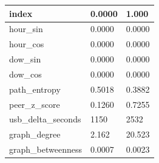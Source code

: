 \begin{tabular}{lll}
\toprule
index & 0.0000 & 1.000 \\
\midrule
hour\_sin & 0.0000 & 0.0000 \\
hour\_cos & 0.0000 & 0.0000 \\
dow\_sin & 0.0000 & 0.0000 \\
dow\_cos & 0.0000 & 0.0000 \\
path\_entropy & 0.5018 & 0.3882 \\
peer\_z\_score & 0.1260 & 0.7255 \\
usb\_delta\_seconds & 1150 & 2532 \\
graph\_degree & 2.162 & 20.523 \\
graph\_betweenness & 0.0007 & 0.0023 \\
\bottomrule
\end{tabular}